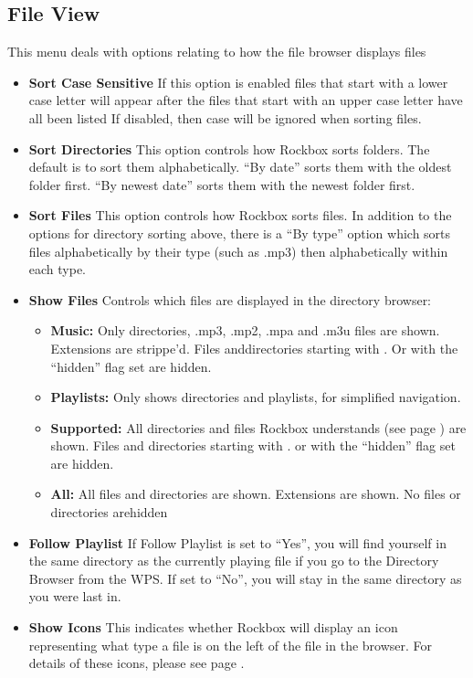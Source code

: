 \subsection{File View}
This menu deals with options relating to how the file browser displays
files

\begin{itemize}
\item \textbf{Sort Case Sensitive}
If this option is enabled files that start with a
lower case letter will appear after the files that start with an upper case letter have all been listed  If disabled, then case will be ignored when sorting files.
\item \textbf{Sort Directories}
This option controls how Rockbox sorts folders.  The default is to sort
them alphabetically.  ``By date'' sorts them with the oldest folder
first.  ``By newest date'' sorts them with the newest folder first.

\item \textbf{Sort Files}
This option controls how Rockbox sorts files.  In addition to the
options for directory sorting above, there is a ``By type'' option
which sorts files alphabetically by their type (such as .mp3) then
alphabetically within each type.

\item \textbf{\label{ref:ShowFiles}Show Files}
Controls which files are displayed in the directory browser:

\begin{itemize}
\item \textbf{Music: }
Only directories, .mp3, .mp2, .mpa and .m3u files
are shown. Extensions are strippe'd. Files anddirectories starting with . Or with the ``hidden'' flag set are hidden.
\item \textbf{Playlists:} 
Only shows directories and playlists, for
simplified navigation.
\item \textbf{Supported:} 
All directories and files Rockbox understands (see page \pageref{ref:Supportedfileformats}) are shown. Files and directories starting with . or with the
``hidden'' flag set are hidden.
\item \textbf{All:}
All files and directories are shown. Extensions are shown. No files or
directories arehidden
\end{itemize}

\item \textbf{Follow Playlist}
If Follow Playlist is set to ``Yes'', you will find yourself in the same
directory as the currently playing file if you go to the Directory
Browser from the WPS. If set to ``No'', you will stay in the same directory as you were last in.

\item \textbf{Show Icons}
This indicates whether Rockbox will display an icon representing what
type a file is on the left of the file in the browser.  For details of
these icons, please see page \pageref{ref:Supportedfileformats}.
\end{itemize}

